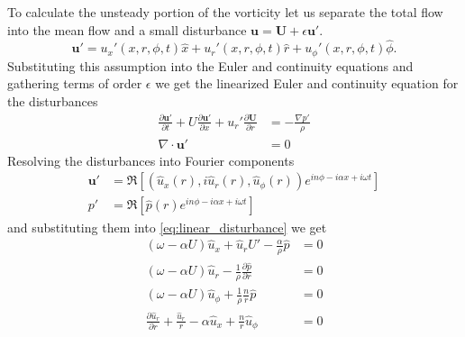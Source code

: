 \documentclass[superscriptaddress, onecolumn, prl]{revtex4}
\begin{document}
To calculate the unsteady portion of the vorticity let us separate the total flow into the mean flow and a small disturbance $\textbf{u} = \textbf{U} + \epsilon \textbf{u}'$.
\begin{equation}
\textbf{u}' = u_x'(x, r, \phi, t) \hat{x} + u_r'(x, r, \phi, t)  \hat{r} + u_\phi'(x, r, \phi, t)  \hat{\phi}.
\end{equation}
Substituting this assumption into the Euler and continuity equations and gathering terms of order $\epsilon$ we get the linearized Euler and continuity equation for the disturbances
\begin{equation}
\begin{split}
\label{eq:linear_disturbance}
\frac{\partial \textbf{u}' }{\partial t} + U \frac{\partial \textbf{u}'}{\partial x} + u_r' \frac{\partial \textbf{U}}{\partial r} &= -\frac{\nabla p'}{\rho} \\
\nabla \cdot \textbf{u}' &= 0 
\end{split}
\end{equation}
Resolving the disturbances into Fourier components
\begin{equation}
\begin{split}
 \textbf{u}' & = \Re \left[ \left( \hat{u}_x(r), i \hat{u}_r(r), \hat{u}_{\phi}(r) \right) e^{in\phi - i \alpha x + i \omega t}   \right] \\
 p' & = \Re \left[ \hat{p}(r) e^{in\phi - i \alpha x + i \omega t} \right]
\end{split}
\end{equation}
and substituting them into \ref{eq:linear_disturbance} we get
\begin{equation}
\begin{split}
(\omega - \alpha U )\hat{u}_x  + \hat{u}_r U' - \frac{\alpha}{\rho} \hat{p} & = 0 \\
(\omega -  \alpha U )\hat{u}_r - \frac{1}{\rho}\frac{\partial \hat{p}}{\partial r} & = 0 \\
(\omega -  \alpha U ) \hat{u}_{\phi} + \frac{1}{\rho}\frac{n}{r} \hat{p} & = 0 \\
\frac{\partial \hat{u}_r}{\partial r} + \frac{\hat{u}_r}{r} - \alpha \hat{u}_x + \frac{n}{r} \hat{u}_{\phi} &=0  
\end{split}
\end{equation}
\end{document}
